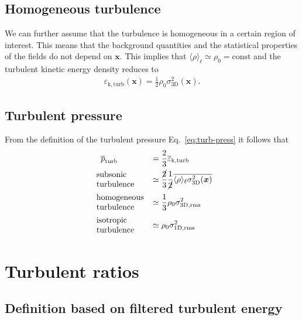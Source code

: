 \documentclass[]{article}
\begin{document}
\subsection{Homogeneous turbulence}

We can further assume that the turbulence is homogeneous in a certain region of interest. This means that the background quantities and the statistical properties of the fields do not depend on $\bm x$. This implies that $\langle \rho \rangle_\ell \simeq \rho_0 = \text{const}$ and the turbulent kinetic energy density reduces to
%
\begin{align}
	\varepsilon_{\mathrm{k,turb}} (\bm x) = \frac{1}{2} \rho_0 \sigma_{\mathrm{3D}}^2 (\bm x).
\end{align}
%


\subsection{Turbulent pressure}

From the definition of the turbulent pressure Eq.~\ref{eq:turb-press} it follows that
%
\begin{align}
	\overline{p}_{\mathrm{turb}} \hspace{4em}  &= \frac{2}{3} \overline{\varepsilon}_{\mathrm{k,turb}} \nonumber \\
	\begin{tabular}{p{6em}}
		subsonic \\ turbulence
	\end{tabular}    &\simeq \frac{\cancel{2}}{3} \frac{1}{\cancel{2}} \overline{\langle \rho \rangle_\ell \sigma_{\mathrm{3D}}^2 (\bm x)} \nonumber \\
	\begin{tabular}{p{6em}}
		homogeneous \\ turbulence
	\end{tabular}    &\simeq \frac{1}{3}  \rho_0 \sigma_{\mathrm{3D,rms}}^2 \nonumber \\
	\begin{tabular}{p{6em}}
	isotropic \\ turbulence
	\end{tabular}    &\simeq   \rho_0 \sigma_{\mathrm{1D,rms}}^2 
\end{align}


\section{Turbulent ratios}

\subsection{Definition based on filtered turbulent energy}
\end{document}
